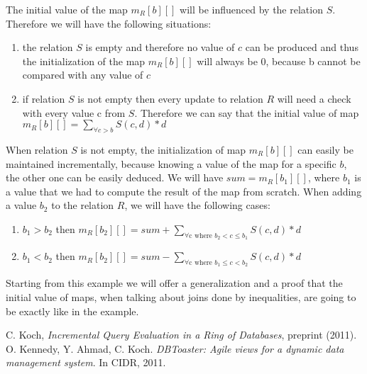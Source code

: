 \documentclass[12pt]{article}
\begin{document}
The initial value of the map $m_R[b][]$ will be influenced by the relation $S$. Therefore we will have the following situations:
\begin{enumerate}
\item the relation $S$ is empty and therefore no value of $c$ can be produced and thus the initialization of the map $m_R[b][]$ will always be 0, because b cannot be compared with any value of $c$
\item if relation $S$ is not empty then every update to relation $R$ will need a check with every value c from $S$. Therefore we can say that the initial value of map $m_R[b][]=\sum_{\forall c>b} S(c,d)*d$
\end{enumerate}

When relation $S$ is not empty, the initialization of map $m_R[b][]$ can easily be maintained incrementally, because knowing a value of the map for a specific $b$, the other one can be easily deduced. We will have $sum=m_R[b_{1}][]$, where $b_{1}$ is a value that we had to compute the result of the map from scratch. When adding a value $b_{2}$ to the relation $R$, we will have the following cases:

\begin{enumerate}
\item $b_{1}>b_{2}$ then $m_R[b_{2}][]=sum + \sum_{\forall\mbox{c where }b_{2}<c\leq b_{1}} S(c,d)*d$
\item $b_{1}<b_{2}$ then $m_R[b_{2}][]=sum - \sum_{\forall\mbox{c where }b_{1}\leq c<b_{2}} S(c,d)*d$
\end{enumerate}

Starting from this example we will offer a generalization and a proof that the initial value of maps, when talking about joins done by inequalities, are going to be exactly like in the example.

\begin{thebibliography}{9}
 C. Koch, \emph{Incremental Query Evaluation in a Ring of Databases},  preprint (2011).
 O. Kennedy, Y. Ahmad, C. Koch. \emph{DBToaster: Agile views for a dynamic data management system}. In CIDR, 2011.
\end{thebibliography}
\end{document}
